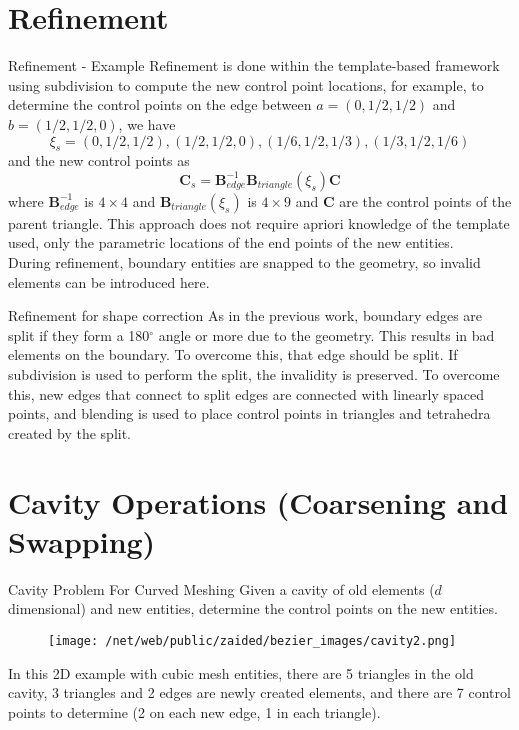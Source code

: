 \documentclass[12pt]{beamer}
\newcommand{\spa}{\vspace{0.5cm}\newline}
\begin{document}
\section{Refinement}
\begin{frame}{Refinement - Example}
Refinement is done within the template-based framework using subdivision to compute the new control point locations, for example, to determine the control points on the edge between $a = (0,1/2,1/2)$ and $b = (1/2,1/2,0)$, we have \[\xi_s = (0,1/2,1/2), (1/2,1/2,0), (1/6,1/2,1/3), (1/3,1/2,1/6) \]
and the new control points as
\[ \mathbf{C}_s = \mathbf{B}^{-1}_{edge}\mathbf{B}_{triangle}(\xi_s) \mathbf{C} \]
where $\mathbf{B}_{edge}^{-1}$ is $4 \times 4$ and $\mathbf{B}_{triangle}(\xi_s)$ is $4 \times 9$ and $\mathbf{C}$ are the control points of the parent triangle. \spa
This approach does not require apriori knowledge of the template used, only the parametric locations of the end points of the new entities. \\
During refinement, boundary entities are snapped to the geometry, so invalid elements can be introduced here.
\end{frame}
\begin{frame}{Refinement for shape correction}
As in the previous work, boundary edges are split if they form a 180$^\circ$ angle or more due to the geometry. This results in bad elements on the boundary. To overcome this, that edge should be split. If subdivision is used to perform the split, the invalidity is preserved. \spa To overcome this, new edges that connect to split edges are connected with linearly spaced points, and blending is used to place control points in triangles and tetrahedra created by the split.

\end{frame}
\section{Cavity Operations (Coarsening and Swapping)}
\begin{frame}{Cavity Problem For Curved Meshing}
Given a cavity of old elements ($d$ dimensional) and new entities, determine the control points on the new entities.
\begin{figure}
  \centering
  \texttt{[image: /net/web/public/zaided/bezier\_images/cavity2.png]} 
\end{figure}
In this 2D example with cubic mesh entities, there are 5 triangles in the old cavity, 3 triangles and 2 edges are newly created elements, and there are 7 control points to determine (2 on each new edge, 1 in each triangle).
\end{frame}
\end{document}
